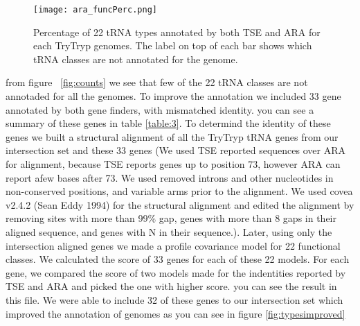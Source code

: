 \documentclass[
10pt, %
a4paper, %
oneside, %
headinclude,footinclude, %
BCOR5mm, %
]{scrartcl}
\begin{document}
\begin{figure}[tb]
\centering 
\texttt{[image: ara\_funcPerc.png]} 
\caption[Genome Comparison]{Percentage of 22 tRNA types annotated by both TSE and ARA for each TryTryp genomes. The label on top of each bar shows which tRNA classes are not annotated for the genome.} %
\label{fig:types} 
\end{figure}

from figure ~\ref{fig:counts} we see that few of the 22 tRNA classes are not annotaded for all the genomes. To improve the annotation we included 33 gene annotated by both gene finders, with mismatched identity. you can see a summary of these genes in table \ref{table:3}. 
To determind the identity of these genes we built a structural alignment of all the TryTryp tRNA genes from our intersection set and these 33 genes (We used TSE reported sequences over ARA for alignment, because TSE reports genes up to position 73, however ARA can report afew bases after 73. We used removed introns and other nucleotides in non-conserved positions, and variable arms prior to the alignment. We used covea v2.4.2 (Sean Eddy 1994) for the structural alignment and edited the alignment by removing sites with more than 99\% gap, genes with more than 8 gaps in their aligned sequence, and genes with N in their sequence.). Later, using only the intersection aligned genes we made a profile covariance model for 22 functional classes. We calculated the score of 33 genes for each of these 22 models. For each gene, we compared the score of two models made for the indentities reported by TSE and ARA and picked the one with higher score. you can see the result in this file. We were able to include 32 of these genes to our intersection set which improved the annotation of genomes as you can see in figure \ref{fig:typesimproved}


\begin{table}[hbt]
\caption{Table of 33 genes annotated by both TSE and ARA with mismatched identity}
\begin{adjustbox}{center}
{}
\label{table:3}
\end{adjustbox}
\end{table}
\end{document}
